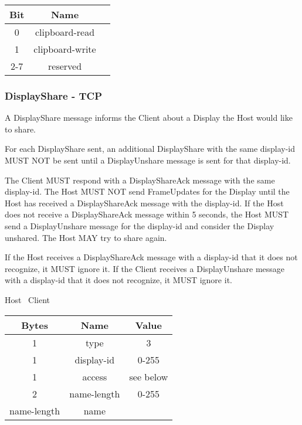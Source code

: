 \begin{center}
    \begin{tabular}{|c|c|c|}
        \hline
        \textbf{Bit} & \textbf{Name}   \\
        \hline
        0            & clipboard-read  \\
        \hline
        1            & clipboard-write \\
        \hline
        2-7          & reserved        \\
        \hline
    \end{tabular}
\end{center}

\subsubsection{DisplayShare - TCP}
A DisplayShare message informs the Client about a Display the Host would like to share.

For each DisplayShare sent, an additional DisplayShare with the same display-id MUST NOT be sent until a
DisplayUnshare message is sent for that display-id.

The Client MUST respond with a DisplayShareAck message with the same display-id.
The Host MUST NOT send FrameUpdates for the Display until the Host has received a DisplayShareAck message with the display-id.
If the Host does not receive a DisplayShareAck message within 5 seconds, the Host MUST send a DisplayUnshare message
for the display-id and consider the Display unshared.
The Host MAY try to share again.

If the Host receives a DisplayShareAck message with a display-id that it does not recognize, it MUST ignore it.
If the Client receives a DisplayUnshare message with a display-id that it does not recognize, it MUST ignore it.

\begin{center}
    Host \textrightarrow\ Client\\
    \begin{tabular}{|c|c|c|}
        \hline
        \textbf{Bytes} & \textbf{Name} & \textbf{Value} \\
        \hline
        1              & type          & 3              \\
        \hline
        1              & display-id    & 0-255          \\
        \hline
        1              & access        & see below      \\
        \hline
        2              & name-length   & 0-255          \\
        \hline
        name-length    & name          &                \\
        \hline
    \end{tabular}
\end{center}

